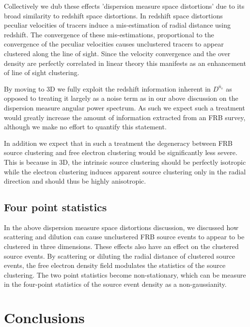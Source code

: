 \documentclass[onecolumn,prd,noshowpacs,nofootinbib,amsmath,amssymb]{revtex4}
\newcommand{\Dne}{D^{\bar{n}_e}}
\begin{document}
Collectively we dub these effects 'dispersion measure space distortions' due
to its broad
similarity to redshift space distortions. In redshift space distortions peculiar
velocities of tracers induce a mis-estimation of radial distance using redshift.
The convergence of these mis-estimations, proportional to the convergence of the
peculiar velocities causes unclustered tracers to appear clustered along the line
of sight. Since the velocity convergence and the over density are perfectly
correlated in linear theory this manifests as an enhancement of line of sight
clustering.

By moving to 3D we fully exploit the redshift information inherent in $\Dne$ as
opposed to treating it largely as a noise term as in our above discussion on
the dispersion measure angular power spectrum. As such we expect such a
treatment would greatly increase the amount of information extracted from an
FRB survey, although we make no effort to quantify this statement.

In addition we expect that in such a treatment the degeneracy between FRB
source clustering and free electron clustering would be significantly less
severe. This is because in 3D, the intrinsic source clustering should be perfectly
isotropic while the electron clustering induces apparent source clustering
only in the radial direction and should thus be highly anisotropic.


\subsection{Four point statistics}

In the above dispersion measure space distortions discussion, we discussed how
scattering and dilution can cause unclustered FRB source events to appear to
be clustered in three dimensions.  These effects also have an effect on the
clustered source events. By scattering or diluting the radial distance of
clustered source events, the free electron density field modulates the
statistics of the source clustering. The two point statistics become
non-stationary, which can be measure in the four-point statistics of the source
event density as a non-gaussianity.


\section{Conclusions}
\end{document}
